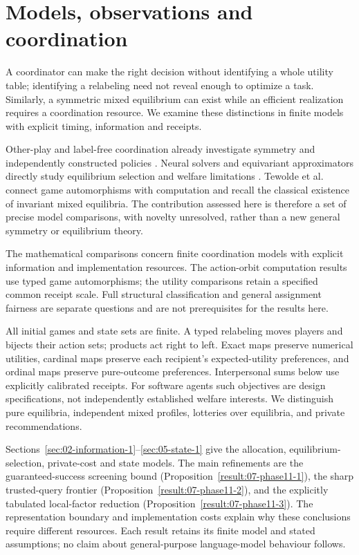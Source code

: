 \section{Models, observations and coordination}\label{sec:01-introduction-1}
A coordinator can make the right decision without identifying a whole utility
table; identifying a relabeling need not reveal enough to optimize a task.
Similarly, a symmetric mixed equilibrium can exist while an efficient
realization requires a coordination resource. We examine these distinctions
in finite models with explicit timing, information and receipts.

Other-play and label-free coordination already investigate symmetry and
independently constructed policies \citep{hu2020,treutlein2021}. Neural
solvers and equivariant approximators directly study equilibrium selection
and welfare limitations \citep{marris2022,duan2023}. Tewolde et al.\
\citep{tewolde2025} connect game automorphisms with computation and recall
the classical existence of invariant mixed equilibria. The contribution
assessed here is therefore a set of precise model comparisons, with novelty
unresolved, rather than a new general symmetry or equilibrium theory.

The mathematical comparisons concern finite coordination models with explicit
information and implementation resources. The action-orbit computation results
use typed game automorphisms; the utility comparisons retain a specified common
receipt scale. Full structural classification and general assignment fairness
are separate questions and are not prerequisites for the results here.

All initial games and state sets are finite. A typed relabeling moves players
and bijects their action sets; products act right to left. Exact maps preserve
numerical utilities, cardinal maps preserve each recipient's expected-utility
preferences, and ordinal maps preserve pure-outcome preferences. Interpersonal
sums below use explicitly calibrated receipts. For software agents such
objectives are design specifications, not independently established welfare
interests. We distinguish pure equilibria, independent mixed profiles,
lotteries over equilibria, and private recommendations.

Sections~\ref{sec:02-information-1}--\ref{sec:05-state-1} give the allocation,
equilibrium-selection, private-cost and state models. The main refinements are
the guaranteed-success screening bound
(Proposition~\ref{result:07-phase11-1}), the sharp trusted-query frontier
(Proposition~\ref{result:07-phase11-2}), and the explicitly tabulated local-factor
reduction (Proposition~\ref{result:07-phase11-3}). The representation boundary
and implementation costs explain why these conclusions require different
resources. Each result retains its finite model and stated assumptions; no
claim about general-purpose language-model behaviour follows.
